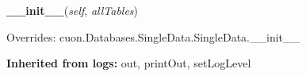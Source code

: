     \begin{boxedminipage}{\textwidth}

    \raggedright \textbf{\_\_init\_\_}(\textit{self}, \textit{allTables})

      Overrides: cuon.Databases.SingleData.SingleData.\_\_init\_\_

    \end{boxedminipage}

  \textbf{Inherited from logs:}
    out,
    printOut,
    setLogLevel
